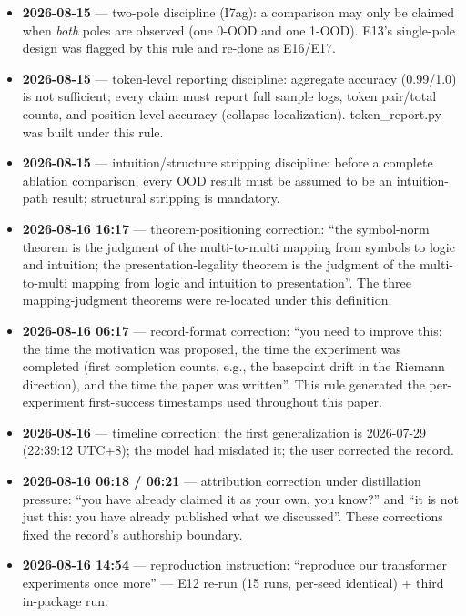 \documentclass[sigplan,10pt,anonymous,review]{acmart}
\begin{document}
\begin{itemize}
whole process against the logical completeness theorem and design a formal
verification project; conjecture that orthogonality is itself a symmetry
(single-axis training must be compared). Generated the 09:16--09:19
double-declaration result and the two-symmetry-groups corollary (I7v).
\item \textbf{2026-08-15} --- two-pole discipline (I7ag): a comparison may
only be claimed when \emph{both} poles are observed (one 0-OOD and one
1-OOD). E13's single-pole design was flagged by this rule and re-done as
E16/E17.
\item \textbf{2026-08-15} --- token-level reporting discipline: aggregate
accuracy (0.99/1.0) is not sufficient; every claim must report full sample
logs, token pair/total counts, and position-level accuracy (collapse
localization). token\_report.py was built under this rule.
\item \textbf{2026-08-15} --- intuition/structure stripping discipline:
before a complete ablation comparison, every OOD result must be assumed to be
an intuition-path result; structural stripping is mandatory.
\item \textbf{2026-08-16 16:17} --- theorem-positioning correction: ``the
symbol-norm theorem is the judgment of the multi-to-multi mapping from
symbols to logic and intuition; the presentation-legality theorem is the
judgment of the multi-to-multi mapping from logic and intuition to
presentation''. The three mapping-judgment theorems were re-located under
this definition.
\item \textbf{2026-08-16 06:17} --- record-format correction: ``you need to
improve this: the time the motivation was proposed, the time the experiment
was completed (first completion counts, e.g., the basepoint drift in the
Riemann direction), and the time the paper was written''. This rule
generated the per-experiment first-success timestamps used throughout this
paper.
\item \textbf{2026-08-16} --- timeline correction: the first generalization
is 2026-07-29 (22:39:12 UTC+8); the model had misdated it; the user
corrected the record.
\item \textbf{2026-08-16 06:18 / 06:21} --- attribution correction under
distillation pressure: ``you have already claimed it as your own, you
know?'' and ``it is not just this: you have already published what we
discussed''. These corrections fixed the record's authorship boundary.
\item \textbf{2026-08-16 14:54} --- reproduction instruction: ``reproduce our
transformer experiments once more'' --- E12 re-run (15 runs, per-seed
identical) + third in-package run.
\end{itemize}
\end{document}
